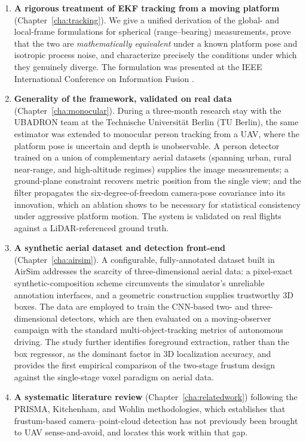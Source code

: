\begin{enumerate}
  \item \textbf{A rigorous treatment of EKF tracking from a moving platform}
  (Chapter~\ref{cha:tracking}). We give a unified derivation of the global- and
  local-frame formulations for spherical (range--bearing) measurements, prove
  that the two are \emph{mathematically equivalent} under a known platform pose
  and isotropic process noise, and characterize precisely the conditions under
  which they genuinely diverge. The formulation was presented at the IEEE
  International Conference on Information Fusion \cite{delima2025fusion}.
  \item \textbf{Generality of the framework, validated on real data}
  (Chapter~\ref{cha:monocular}). During a three-month research stay with the
  UBADRON team at the Technische Universit\"at Berlin (TU Berlin), the
  same estimator was extended to monocular person tracking from a UAV, where the
  platform pose is uncertain and depth is unobservable. A person detector trained on a union of
  complementary aerial datasets (spanning urban, rural near-range, and
  high-altitude regimes) supplies the image measurements; a ground-plane
  constraint recovers metric position from the single view; and the filter
  propagates the six-degree-of-freedom camera-pose covariance into its
  innovation, which an ablation shows to be necessary for statistical
  consistency under aggressive platform motion. The system is validated on real
  flights against a LiDAR-referenced ground truth.
  \item \textbf{A synthetic aerial dataset and detection front-end}
  (Chapter~\ref{cha:airsim}). A configurable, fully-annotated dataset built in
  AirSim addresses the scarcity of three-dimensional aerial data: a pixel-exact
  synthetic-composition scheme circumvents the simulator's unreliable annotation
  interfaces, and a geometric construction supplies trustworthy 3D boxes. The data
  are employed to train the CNN-based two- and three-dimensional detectors, which
  are then evaluated on a moving-observer campaign with the standard
  multi-object-tracking metrics of autonomous driving. The study further identifies
  foreground extraction, rather than the box regressor, as the dominant factor in 3D
  localization accuracy, and provides the first empirical comparison of the
  two-stage frustum design against the single-stage voxel paradigm on aerial data.
  \item \textbf{A systematic literature review} (Chapter~\ref{cha:relatedwork})
  following the PRISMA, Kitchenham, and Wohlin methodologies, which establishes
  that frustum-based camera--point-cloud detection has not previously been
  brought to UAV sense-and-avoid, and locates this work within that gap.
\end{enumerate}

